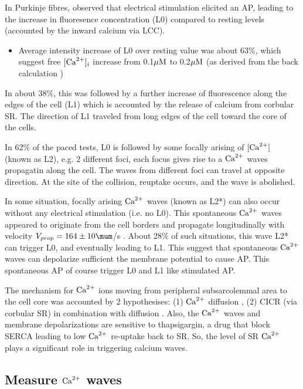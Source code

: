 In Purkinje fibres, \citep{wier2000} observed that electrical stimulation
elicited an AP, leading to the increase in fluoresence concentration (L0)
compared to resting levels (accounted by the inward calcium via LCC). 
\begin{itemize}
  \item Average intensity increase of L0 over resting value was about 63\%,
  which suggest free $[{\text{Ca}^{2+}}]_i$ increase from 0.1${\mu\text{M}}$ to 0.2${\mu\text{M}}$ (as derived
  from the back calculation \citep{cheng1993cse})
\end{itemize}
In about 38\%, this was followed by a further increase of fluorescence along the
edges of the cell (L1) which is accounted by the release of calcium from corbular SR. The
direction of L1 traveled from long edges of the cell toward the core of the
cells. 

In 62\% of the paced tests, L0 is followed by some focally arising of $[{\text{Ca}^{2+}}]$
(known as L2), e.g. 2 different foci, each focus gives rise to a ${\text{Ca}^{2+}}$ waves
propagatin along the cell. The waves from different foci can travel at opposite direction. At the
site of the collision, reuptake occurs, and the wave is abolished. 

In some situation, focally arising ${\text{Ca}^{2+}}$ waves (known as L2*) can also occur
without any electrical stimulation (i.e. no L0). This spontaneous ${\text{Ca}^{2+}}$ waves
appeared to originate from the cell borders and propagate longitudinally with
velocity $V_{prop}=164\pm 10 \mum$/s \citep{wier2000}. About 28\% of such
situations, this wave L2* can trigger L0, and eventually leading to L1. This
suggest that spontaneous ${\text{Ca}^{2+}}$ waves can depolarize sufficient the membrane
potential to cause AP. This spontaneous AP of course trigger L0 and L1 like 
stimulated AP. 

The mechanism for ${\text{Ca}^{2+}}$ ions moving from peripheral subsarcolemmal area to the
cell core was accounted by 2 hypothesises: (1) ${\text{Ca}^{2+}}$ diffusion
\citep{spitzer1997}, (2) CICR (via corbular SR) in combination with diffusion
\citep{wier2000}. Also, the ${\text{Ca}^{2+}}$ waves and membrane depolarizations are
sensitive to thapsigargin, a drug that block SERCA leading to low ${\text{Ca}^{2+}}$
re-uptake back to SR. So, the level of SR ${\text{Ca}^{2+}}$ plays a significant role in
triggering calcium waves. 

\subsection{Measure ${\text{Ca}^{2+}}$ waves}
\label{sec:measure_Ca-wave_RYR}

